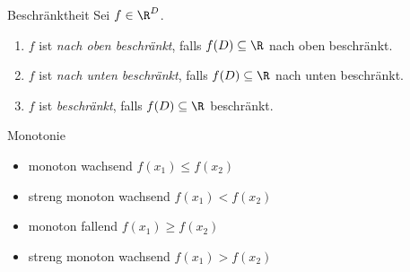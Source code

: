 \begin{definition}{Beschränktheit}
    Sei $f \in \R^D$.
    \begin{enumerate}
        \item $f$ ist \emph{nach oben beschränkt}, falls $f(D) \subseteq \R$ nach oben beschränkt.
        \item $f$ ist \emph{nach unten beschränkt}, falls $f(D) \subseteq \R$ nach unten beschränkt.
        \item $f$ ist \emph{beschränkt}, falls $f(D) \subseteq \R$ beschränkt.
    \end{enumerate}
\end{definition}

\begin{definition}{Monotonie}
    \begin{itemize}
  \item monoton wachsend $f\left(x_{1}\right) \leq f\left(x_{2}\right)$
  \item streng monoton wachsend $f\left(x_{1}\right)<f\left(x_{2}\right)$
  \item monoton fallend $f\left(x_{1}\right) \geq f\left(x_{2}\right)$
  \item streng monoton wachsend $f\left(x_{1}\right)>f\left(x_{2}\right)$
\end{itemize}
\end{definition}


